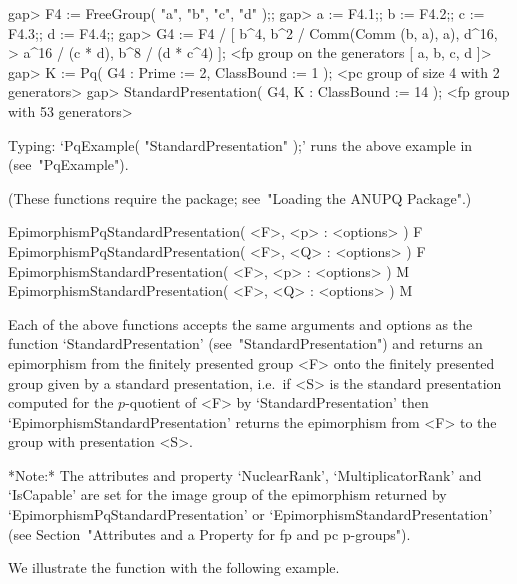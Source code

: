 gap> F4 := FreeGroup( "a", "b", "c", "d" );;                        
gap> a := F4.1;; b := F4.2;; c := F4.3;; d := F4.4;;
gap> G4 := F4 / [ b^4, b^2 / Comm(Comm (b, a), a), d^16,                
>                 a^16 / (c * d), b^8 / (d * c^4) ];
<fp group on the generators [ a, b, c, d ]>
gap> K := Pq( G4 : Prime := 2, ClassBound := 1 );
<pc group of size 4 with 2 generators>
gap> StandardPresentation( G4, K : ClassBound := 14 );
<fp group with 53 generators>
\endexample

Typing: `PqExample( "StandardPresentation" );' runs the above example  in
{\GAP} (see~"PqExample").

(These functions require the {\ANUPQ}  package;  see~"Loading  the  ANUPQ
Package".)

\>EpimorphismPqStandardPresentation( <F>, <p> : <options> ) F
\>EpimorphismPqStandardPresentation( <F>, <Q> : <options> ) F
\>EpimorphismStandardPresentation( <F>, <p> : <options> ) M
\>EpimorphismStandardPresentation( <F>, <Q> : <options> ) M

Each of the above functions accepts the same arguments and options as the
function `StandardPresentation' (see~"StandardPresentation") and  returns
an epimorphism from the finitely presented group <F>  onto  the  finitely
presented group given by a standard  presentation,  i.e.~if  <S>  is  the
standard  presentation  computed  for  the   $p$-quotient   of   <F>   by
`StandardPresentation' then `EpimorphismStandardPresentation' returns the
epimorphism from <F> to the group with presentation <S>.

*Note:*
The  attributes  and  property  `NuclearRank',  `MultiplicatorRank'   and
`IsCapable' are set for the image group of the  epimorphism  returned  by
`EpimorphismPqStandardPresentation' or  `EpimorphismStandardPresentation'
(see Section~"Attributes and a Property for fp and pc p-groups").

We illustrate the function with the following example.

